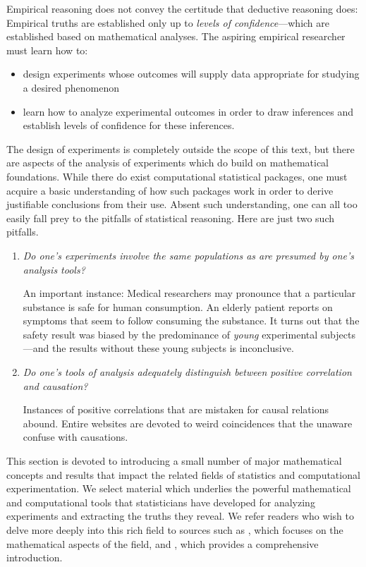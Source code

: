 Empirical reasoning does not convey the certitude that deductive reasoning does:  Empirical truths are established only up to {\em levels of confidence}---which are established based on mathematical analyses.  
The aspiring empirical researcher must learn how to:
\begin{itemize}
\item
design experiments whose outcomes will supply data appropriate for studying a desired phenomenon
\item
learn how to analyze experimental outcomes in order to draw inferences and establish levels of confidence for these inferences.
\end{itemize}
The design of experiments is completely outside the scope of this text, but there are aspects of the analysis of experiments which do build on mathematical foundations.  While there do exist computational statistical packages, one must acquire a basic understanding of how such packages work in order to derive justifiable conclusions from their use.  Absent such understanding, one can all too easily fall prey to the pitfalls of statistical reasoning.  Here are just two such pitfalls.
\begin{enumerate}
\item
{\em Do one's experiments involve the same populations as are presumed by one's analysis tools?} 

An important instance: Medical researchers may pronounce that a particular substance is safe for human consumption.  An elderly patient reports on symptoms that seem to follow consuming the substance.  It turns out that the safety result was biased by the predominance of {\em young} experimental subjects---and the results without these young subjects is inconclusive.

\item
{\em Do one's tools of analysis adequately distinguish between {\em positive correlation} and {\em causation}?}

Instances of positive correlations that are mistaken for causal relations abound.  Entire websites are devoted to weird coincidences that the unaware confuse with causations.
\end{enumerate}

This section is devoted to introducing a small number of major mathematical concepts and results that impact the related fields of statistics and computational experimentation.  We select material which underlies the powerful mathematical and computational tools that statisticians have developed for analyzing experiments and extracting the truths they reveal.  We refer readers who wish to delve more deeply into this rich field to sources such as \cite{Hoel58}, which focuses on the mathematical aspects of the field, and \cite{Bremaud17}, which provides a comprehensive introduction.

